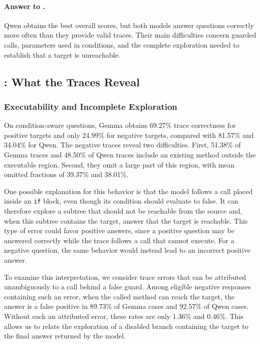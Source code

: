 \paragraph{Answer to .}
Qwen obtains the best overall scores, but both models answer questions correctly more often than they provide valid traces. Their main difficulties concern guarded calls, parameters used in conditions, and the complete exploration needed to establish that a target is unreachable.

\subsection{: What the Traces Reveal}

\subsubsection{Executability and Incomplete Exploration}

On condition-aware questions, Gemma obtains 69.27\% trace correctness for positive targets and only 24.99\% for negative targets, compared with 81.57\% and 34.04\% for Qwen. The negative traces reveal two difficulties. First, 51.38\% of Gemma traces and 48.50\% of Qwen traces include an existing method outside the executable region. Second, they omit a large part of this region, with mean omitted fractions of 39.37\% and 38.01\%.

One possible explanation for this behavior is that the model follows a call placed inside an \texttt{if} block, even though its condition should evaluate to false. It can therefore explore a subtree that should not be reachable from the source and, when this subtree contains the target, answer that the target is reachable. This type of error could favor positive answers, since a positive question may be answered correctly while the trace follows a call that cannot execute. For a negative question, the same behavior would instead lead to an incorrect positive answer.

To examine this interpretation, we consider trace errors that can be attributed unambiguously to a call behind a false guard. Among eligible negative responses containing such an error, when the called method can reach the target, the answer is a false positive in 89.73\% of Gemma cases and 92.57\% of Qwen cases. Without such an attributed error, these rates are only 1.36\% and 0.46\%. This allows us to relate the exploration of a disabled branch containing the target to the final answer returned by the model.

